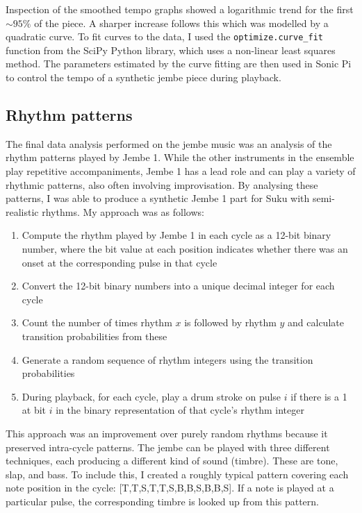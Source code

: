\documentclass[12pt,twoside,openright]{report}
\begin{document}
Inspection of the smoothed tempo graphs showed a logarithmic trend for the first $\sim95\%$ of the piece. A sharper increase follows this which was
modelled by a quadratic curve. To fit curves to the data, I used the \verb'optimize.curve_fit' function from the SciPy Python library, which uses a non-linear least
squares method. The parameters estimated by the curve fitting are then used in Sonic Pi
to control the tempo of a synthetic jembe piece during playback.


\subsection{Rhythm patterns} \label{rhythm_patterns}

The final data analysis performed on the jembe music was an analysis of the
rhythm patterns played by Jembe 1. While the other instruments in the ensemble
play repetitive accompaniments, Jembe 1 has a lead role and can play a variety
of rhythmic patterns, also often involving improvisation. By analysing these
patterns, I was able to produce a synthetic Jembe 1 part for Suku with
semi-realistic rhythms. My approach was as follows:

\begin{enumerate}
    \item Compute the rhythm played by Jembe 1 in each cycle as a 12-bit binary number, where the bit value at each position indicates whether there was an onset at the corresponding pulse in that cycle
    \item Convert the 12-bit binary numbers into a unique decimal integer for each cycle
    \item Count the number of times rhythm $x$ is followed by rhythm $y$ and calculate transition probabilities from these
    \item Generate a random sequence of rhythm integers using the transition probabilities
    \item During playback, for each cycle, play a drum stroke on pulse $i$ if there is a 1 at bit $i$ in the binary representation of that cycle's rhythm integer
\end{enumerate}

This approach was an improvement over purely random rhythms because it preserved
intra-cycle patterns. The jembe can be played with three different techniques,
each producing a different kind of sound (timbre). These are tone, slap, and
bass. To include this, I created a roughly typical pattern covering each note
position in the cycle: [T,T,S,T,T,S,B,B,S,B,B,S]. If a note is played at a
particular pulse, the corresponding timbre is looked up from this pattern.
\end{document}
